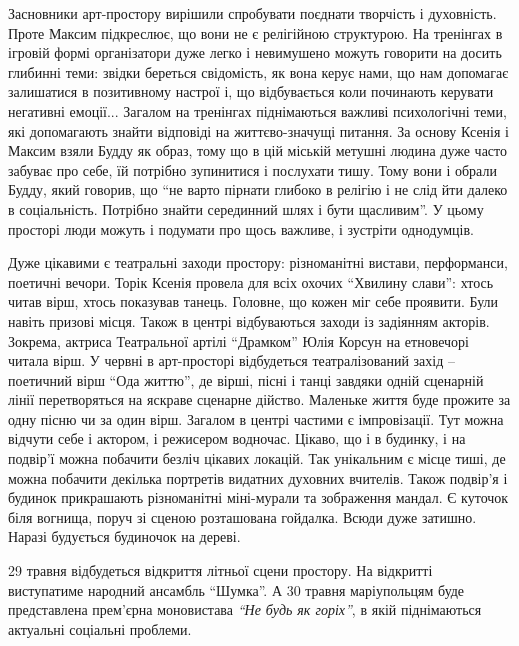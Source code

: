 Засновники
арт-простору вирішили спробувати поєднати творчість і духовність. Проте Максим
підкреслює, що вони не є релігійною структурою. На тренінгах в ігровій формі
організатори дуже легко і невимушено можуть говорити на досить глибинні теми:
звідки береться свідомість, як вона керує нами, що нам допомагає залишатися в
позитивному настрої і, що відбувається коли починають керувати негативні
емоції... Загалом на тренінгах піднімаються важливі психологічні теми, які
допомагають знайти відповіді на життєво-значущі питання. За основу Ксенія і
Максим взяли Будду як образ, тому що в цій міській метушні людина дуже часто
забуває про себе, їй потрібно зупинитися і послухати тишу. Тому вони і обрали
Будду, який говорив, що \enquote{не варто пірнати глибоко в релігію і не слід йти далеко
в соціальність. Потрібно знайти серединний шлях і бути щасливим}. У цьому
просторі люди можуть і подумати про щось важливе, і зустріти однодумців.


Дуже цікавими є  театральні заходи простору: різноманітні вистави, перформанси,
поетичні вечори. Торік Ксенія провела для всіх охочих \enquote{Хвилину слави}: хтось
читав вірш, хтось показував танець. Головне, що кожен міг себе проявити. Були
навіть призові місця. Також в центрі відбуваються заходи із задіянням акторів.
Зокрема, актриса Театральної артілі \enquote{Драмком} Юлія Корсун на етновечорі читала
вірш. У червні в арт-просторі відбудеться театралізований захід – поетичний
вірш \enquote{Ода життю}, де вірші, пісні і танці завдяки одній сценарній лінії
перетворяться на яскраве сценарне дійство. Маленьке життя буде прожите за одну
пісню чи за один вірш. Загалом в центрі частими є імпровізації. Тут можна
відчути себе і актором, і режисером водночас. Цікаво, що і в будинку, і на
подвір'ї можна побачити безліч цікавих локацій. Так унікальним є місце тиші, де
можна побачити декілька портретів видатних духовних вчителів. Також подвір'я і
будинок прикрашають різноманітні міні-мурали та зображення мандал. Є куточок
біля вогнища, поруч зі сценою розташована гойдалка. Всюди дуже затишно. Наразі
будується будиночок на дереві.


29 травня відбудеться відкриття літньої сцени простору. На відкритті
виступатиме народний ансамбль \enquote{Шумка}. А 30 травня маріупольцям буде
представлена прем'єрна моновистава \emph{\enquote{Не будь як горіх}}, в якій піднімаються
актуальні соціальні проблеми.

